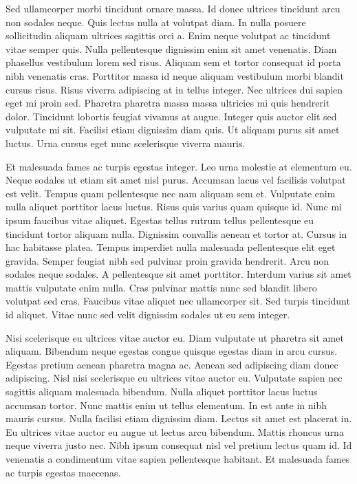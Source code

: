 \documentclass[epsf,a4paper]{book}
\begin{document}
Sed ullamcorper morbi tincidunt ornare massa. Id donec ultrices tincidunt arcu non sodales neque. Quis lectus nulla at volutpat diam. In nulla posuere sollicitudin aliquam ultrices sagittis orci a. Enim neque volutpat ac tincidunt vitae semper quis. Nulla pellentesque dignissim enim sit amet venenatis. Diam phasellus vestibulum lorem sed risus. Aliquam sem et tortor consequat id porta nibh venenatis cras. Porttitor massa id neque aliquam vestibulum morbi blandit cursus risus. Risus viverra adipiscing at in tellus integer. Nec ultrices dui sapien eget mi proin sed. Pharetra pharetra massa massa ultricies mi quis hendrerit dolor. Tincidunt lobortis feugiat vivamus at augue. Integer quis auctor elit sed vulputate mi sit. Facilisi etiam dignissim diam quis. Ut aliquam purus sit amet luctus. Urna cursus eget nunc scelerisque viverra mauris.

Et malesuada fames ac turpis egestas integer. Leo urna molestie at elementum eu. Neque sodales ut etiam sit amet nisl purus. Accumsan lacus vel facilisis volutpat est velit. Tempus quam pellentesque nec nam aliquam sem et. Vulputate enim nulla aliquet porttitor lacus luctus. Risus quis varius quam quisque id. Nunc mi ipsum faucibus vitae aliquet. Egestas tellus rutrum tellus pellentesque eu tincidunt tortor aliquam nulla. Dignissim convallis aenean et tortor at. Cursus in hac habitasse platea. Tempus imperdiet nulla malesuada pellentesque elit eget gravida. Semper feugiat nibh sed pulvinar proin gravida hendrerit. Arcu non sodales neque sodales. A pellentesque sit amet porttitor. Interdum varius sit amet mattis vulputate enim nulla. Cras pulvinar mattis nunc sed blandit libero volutpat sed cras. Faucibus vitae aliquet nec ullamcorper sit. Sed turpis tincidunt id aliquet. Vitae nunc sed velit dignissim sodales ut eu sem integer.

Nisi scelerisque eu ultrices vitae auctor eu. Diam vulputate ut pharetra sit amet aliquam. Bibendum neque egestas congue quisque egestas diam in arcu cursus. Egestas pretium aenean pharetra magna ac. Aenean sed adipiscing diam donec adipiscing. Nisl nisi scelerisque eu ultrices vitae auctor eu. Vulputate sapien nec sagittis aliquam malesuada bibendum. Nulla aliquet porttitor lacus luctus accumsan tortor. Nunc mattis enim ut tellus elementum. In est ante in nibh mauris cursus. Nulla facilisi etiam dignissim diam. Lectus sit amet est placerat in. Eu ultrices vitae auctor eu augue ut lectus arcu bibendum. Mattis rhoncus urna neque viverra justo nec. Nibh ipsum consequat nisl vel pretium lectus quam id. Id venenatis a condimentum vitae sapien pellentesque habitant. Et malesuada fames ac turpis egestas maecenas.
\end{document}
